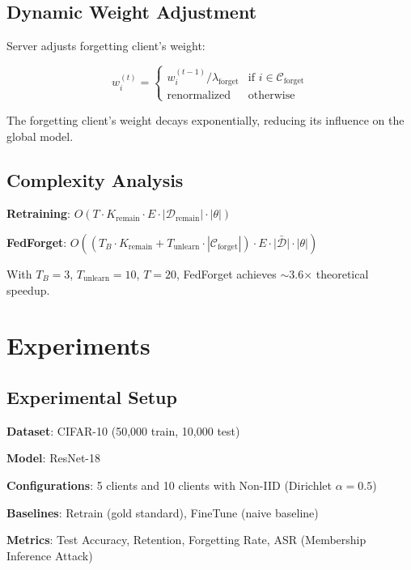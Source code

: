 \documentclass[10pt,twocolumn]{article}
\begin{document}
\subsection{Dynamic Weight Adjustment}

Server adjusts forgetting client's weight:

\begin{equation}
w_i^{(t)} = \begin{cases}
w_i^{(t-1)} / \lambda_{\text{forget}} & \text{if } i \in \mathcal{C}_{\text{forget}} \\
\text{renormalized} & \text{otherwise}
\end{cases}
\end{equation}

The forgetting client's weight decays exponentially, reducing its influence on the global model.

\subsection{Complexity Analysis}

\textbf{Retraining}: $O(T \cdot K_{\text{remain}} \cdot E \cdot |\mathcal{D}_{\text{remain}}| \cdot |\theta|)$

\textbf{FedForget}: $O((T_B \cdot K_{\text{remain}} + T_{\text{unlearn}} \cdot |\mathcal{C}_{\text{forget}}|) \cdot E \cdot \bar{|\mathcal{D}|} \cdot |\theta|)$

With $T_B = 3$, $T_{\text{unlearn}} = 10$, $T = 20$, FedForget achieves $\sim$3.6$\times$ theoretical speedup.

\section{Experiments}

\subsection{Experimental Setup}

\textbf{Dataset}: CIFAR-10 (50,000 train, 10,000 test)

\textbf{Model}: ResNet-18

\textbf{Configurations}: 5 clients and 10 clients with Non-IID (Dirichlet $\alpha=0.5$)

\textbf{Baselines}: Retrain (gold standard), FineTune (naive baseline)

\textbf{Metrics}: Test Accuracy, Retention, Forgetting Rate, ASR (Membership Inference Attack)
\end{document}
